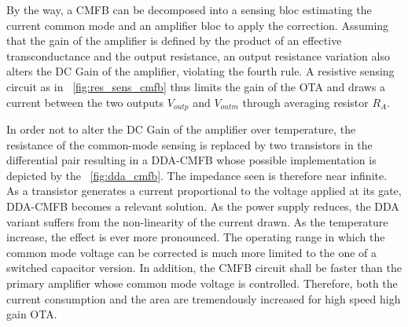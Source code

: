 By the way, a CMFB can be decomposed into a sensing bloc estimating the current common mode and an amplifier bloc to apply the correction. Assuming that the gain of the amplifier is defined by the product of an effective transconductance and the output resistance, an output resistance variation also alters the DC Gain of the amplifier, violating the fourth rule. A resistive sensing circuit as in \figurename~\ref{fig:res_sens_cmfb} thus limits the gain of the OTA and draws a current between the two outputs \(V_{outp}\) and \(V_{outm}\) through averaging resistor \(R_A \). 

In order not to alter the DC Gain of the amplifier over temperature, the resistance of the common-mode sensing is replaced by two transistors in the differential pair resulting in a DDA-CMFB whose possible implementation is depicted by the \figurename~\ref{fig:dda_cmfb}. The impedance seen is therefore near infinite. As a transistor generates a current proportional to the voltage applied at its gate, DDA-CMFB becomes a relevant solution. As the power supply reduces, the DDA variant suffers from the non-linearity of the current drawn. As the temperature increase, the effect is ever more pronounced. The operating range in which the common mode voltage can be corrected is much more limited to the one of a switched capacitor version. In addition, the CMFB circuit shall be faster than the primary amplifier whose common mode voltage is controlled. Therefore, both the current consumption and the area are tremendously increased for high speed high gain OTA\@.

